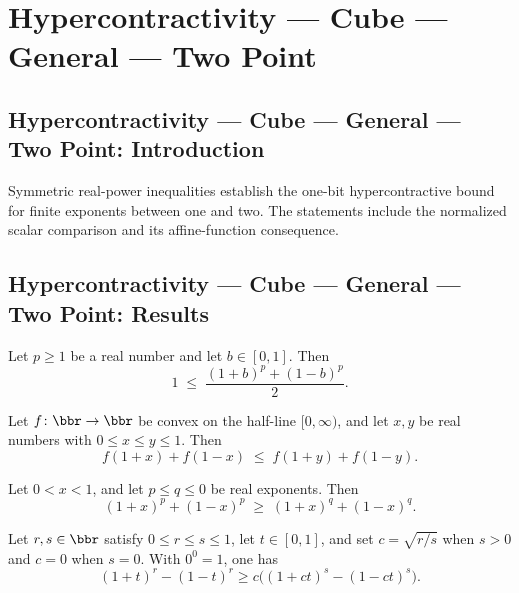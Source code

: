\section{Hypercontractivity --- Cube --- General --- Two Point}
\subsection*{Hypercontractivity --- Cube --- General --- Two Point: Introduction}
Symmetric real-power inequalities establish the one-bit hypercontractive bound for finite exponents between one and two. The statements include the normalized scalar comparison and its affine-function consequence.

\subsection*{Hypercontractivity --- Cube --- General --- Two Point: Results}

\begin{lemma}
\leanok
{}
\label{BooleanAnalysis.Hypercontractivity.avg_rpow_ge_one}
Let $p \ge 1$ be a real number and let $b \in [0,1]$. Then
\[
  1 \;\le\; \frac{(1+b)^p + (1-b)^p}{2}.
\]
\end{lemma}

\begin{lemma}
\leanok
{}
\label{BooleanAnalysis.Hypercontractivity.convex_sym_sum_mono}
Let $f\colon\bbr\to\bbr$ be convex on the half-line $[0,\infty)$, and let $x,y$ be real
numbers with $0 \le x \le y \le 1$. Then
\[
  f(1+x) + f(1-x) \;\le\; f(1+y) + f(1-y).
\]
\end{lemma}

\begin{lemma}
\leanok
{}
\label{BooleanAnalysis.Hypercontractivity.rpow_sum_antitone_exponent}
Let $0 < x < 1$, and let $p \le q \le 0$ be real exponents. Then
\[
  (1+x)^p + (1-x)^p \;\ge\; (1+x)^q + (1-x)^q.
\]
\end{lemma}

\begin{lemma}
\leanok
{}
\label{BooleanAnalysis.Hypercontractivity.h_alpha_ineq}
Let $r,s\in\bbr$ satisfy $0\le r\le s\le1$, let $t\in[0,1]$, and set
$c=\sqrt{r/s}$ when $s>0$ and $c=0$ when $s=0$. With $0^0=1$, one has
\[
  (1+t)^r-(1-t)^r\ge c\bigl((1+ct)^s-(1-ct)^s\bigr).
\]
\end{lemma}

